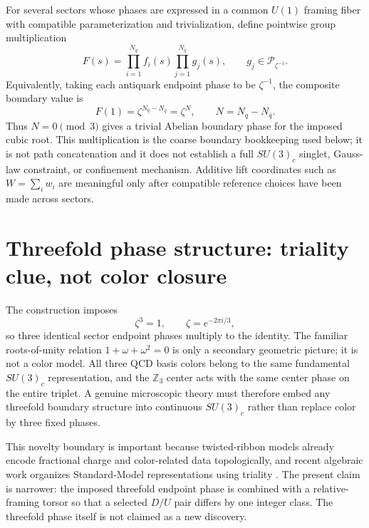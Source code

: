\documentclass[aps,prd,reprint,superscriptaddress,nofootinbib,longbibliography,floatfix]{revtex4-2}
\begin{document}
For several sectors whose phases are expressed in a common $U(1)$ framing fiber with compatible parameterization and trivialization, define pointwise group multiplication
\begin{equation}
F(s)=
\prod_{i=1}^{N_q} f_i(s)
\prod_{j=1}^{N_{\bar q}} g_j(s),
\qquad g_j\in\mathcal P_{\zeta^{-1}}.
\label{eq:compositeF}
\end{equation}
Equivalently, taking each antiquark endpoint phase to be $\zeta^{-1}$, the composite boundary value is
\begin{equation}
F(1)=\zeta^{N_q-N_{\bar q}}=\zeta^N,
\qquad
N=N_q-N_{\bar q}.
\label{eq:compositeendpoint}
\end{equation}
Thus $N=0\pmod3$ gives a trivial Abelian boundary phase for the imposed cubic root. This multiplication is the coarse boundary bookkeeping used below; it is not path concatenation and it does not establish a full $SU(3)_c$ singlet, Gauss-law constraint, or confinement mechanism. Additive lift coordinates such as $W=\sum_i w_i$ are meaningful only after compatible reference choices have been made across sectors.

\section{Threefold phase structure: triality clue, not color closure}
\label{sec:closure}

The construction imposes
\begin{equation}
\zeta^3=1,
\qquad
\zeta=e^{-2\pi i/3},
\label{eq:zetaclosure}
\end{equation}
so three identical sector endpoint phases multiply to the identity. The familiar roots-of-unity relation $1+\omega+\omega^2=0$ is only a secondary geometric picture; it is not a color model. All three QCD basis colors belong to the same fundamental $SU(3)_c$ representation, and the $\mathbb Z_3$ center acts with the same center phase on the entire triplet. A genuine microscopic theory must therefore embed any threefold boundary structure into continuous $SU(3)_c$ rather than replace color by three fixed phases.

This novelty boundary is important because twisted-ribbon models already encode fractional charge and color-related data topologically, and recent algebraic work organizes Standard-Model representations using triality \cite{BilsonThompson2005,Chester2025,FureyHughes2025}. The present claim is narrower: the imposed threefold endpoint phase is combined with a relative-framing torsor so that a selected $D/U$ pair differs by one integer class. The threefold phase itself is not claimed as a new discovery.
\end{document}
